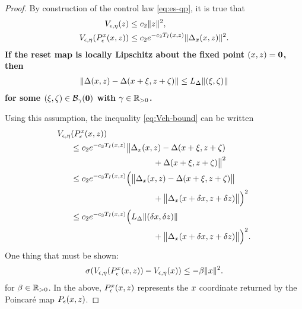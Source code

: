 \documentclass[twocolumn]{article}
\begin{document}
\begin{proof}
  By construction of the control law \eqref{eq:es-qp}, it is true that
  \begin{align}
    V_{\epsilon, \eta}(z) &\leq c_{2} \| z \|^{2},\\
    \nonumber
    V_{\epsilon, \eta}(P_{\epsilon}^{x}(x, z)) &\leq c_{2} e^{-c_{3} T_{I}(x, z)} \| \Delta_{x}(x, z) \|^{2}.
  \end{align}
  {\bf If the reset map is locally Lipschitz about the fixed point $(x, z) = \mathbf{0}$, then
    \begin{align}
      \label{eq:Veh-bound}
      \| \Delta(x, z) - \Delta(x + \xi, z + \zeta) \| \leq L_{\Delta} \| (\xi, \zeta) \|
    \end{align}
    for some $(\xi, \zeta) \in \mathcal{B}_{\gamma}(\mathbf{0})$ with $\gamma \in \mathbb{R}_{> 0}$.}
  
  Using this assumption, the inequality \eqref{eq:Veh-bound} can be written
  \begin{align}
    \nonumber
    \Vee&(\Pe^{\zdx}(\zdx, \zdz))\\
    \nonumber
    &\leq c_{2} e^{-c_{3} T_{I}(\zdx, \zdz)} \big\| \Delta_{\zdx}(\zdx, \zdz) - \Delta(\zdx + \zdxp, \zdz + \zdzp)\\
    \nonumber
    & \hspace{3.5cm}  + \Delta(\zdx + \zdxp, \zdz + \zdzp)\big\|^{2}\\
    \nonumber
    &\leq c_{2} e^{-c_{3} T_{I}(\zdx, \zdz)} \Big( \big\| \Delta_{\zdx}(\zdx, \zdz) - \Delta(\zdx + \zdxp, \zdz + \zdzp) \big\|\\
    \nonumber
    & \hspace{3.5cm} + \big\| \Delta_{\zdx}(\zdx + \delta \zdx, \zdz + \delta \zdz)\big\| \Big)^{2}\\
    \nonumber
    &\leq c_{2} e^{-c_{3} T_{I}(\zdx, \zdz)} \Big( L_{\Delta} \| (\delta \zdx, \delta \zdz) \|\\
    \nonumber
    & \hspace{3.5cm} + \big\| \Delta_{\zdx}(\zdx + \delta \zdx, \zdz + \delta \zdz) \big\| \Big)^{2}.
  \end{align}
  One thing that must be shown:
  \begin{align}
    \sigma(V_{\epsilon, \eta}(P_{\epsilon}^{x}(x, z)) - V_{\epsilon, \eta}(x)) \leq -\beta \| x \|^{2}.
  \end{align}
  for $\beta \in \mathbb{R}_{> 0}$.
  In the above, $P_{\epsilon}^{x}(x, z)$ represents the $x$ coordinate returned by the Poincar{\'e} map $P_{\epsilon}(x, z)$.
\end{proof}
\end{document}
